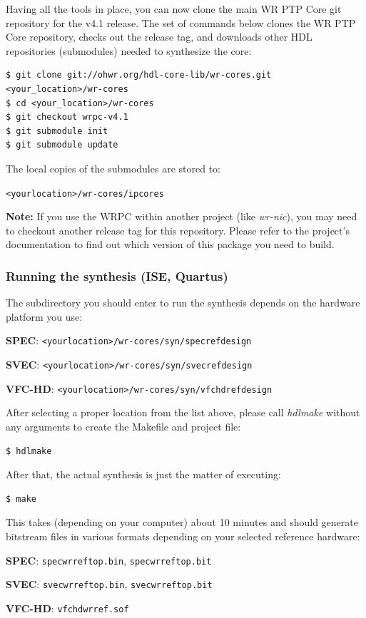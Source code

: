 \documentclass[a4paper, 12pt]{article}
\renewcommand{\_}{\underscore\allowbreak}
\begin{document}
Having all the tools in place, you can now clone the main WR PTP Core git
repository for the v4.1 release. The set of commands below clones the WR PTP Core
repository, checks out the release tag, and downloads other HDL repositories
(submodules) needed to synthesize the core:
\begin{lstlisting}
$ git clone git://ohwr.org/hdl-core-lib/wr-cores.git <your_location>/wr-cores
$ cd <your_location>/wr-cores
$ git checkout wrpc-v4.1
$ git submodule init
$ git submodule update
\end{lstlisting}

The local copies of the submodules are stored to:

\texttt{<your\_location>/wr-cores/ip\_cores}

\vspace{1em}
\textbf{Note:} If you use the WRPC within another project (like
\textit{wr-nic}), you may need to checkout another release tag for this
repository. Please refer to the project's documentation to find out which
version of this package you need to build.

\subsubsection{Running the synthesis (ISE, Quartus)}
The subdirectory you should enter to run the synthesis depends on the hardware
platform you use:
\begin{itemize*}
  \item \textbf{SPEC}: \texttt{<your\_location>/wr-cores/syn/spec\_ref\_design}
  \item \textbf{SVEC}: \texttt{<your\_location>/wr-cores/syn/svec\_ref\_design}
  \item \textbf{VFC-HD}: \texttt{<your\_location>/wr-cores/syn/vfchd\_ref\_design}
\end{itemize*}

After selecting a proper location from the list above, please call
\textit{hdlmake} without any arguments to create the Makefile and project file:
\begin{lstlisting}
$ hdlmake
\end{lstlisting}

After that, the actual synthesis is just the matter of executing:
\begin{lstlisting}
$ make
\end{lstlisting}

This takes (depending on your computer) about 10 minutes and should generate
bitstream files in various formats depending on your selected reference
hardware:
\begin{itemize*}
  \item \textbf{SPEC}: \texttt{spec\_wr\_ref\_top.bin}, \texttt{spec\_wr\_ref\_top.bit}
  \item \textbf{SVEC}: \texttt{svec\_wr\_ref\_top.bin}, \texttt{svec\_wr\_ref\_top.bit}
  \item \textbf{VFC-HD}: \texttt{vfchd\_wr\_ref.sof}
\end{itemize*}
\end{document}
